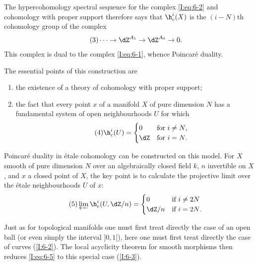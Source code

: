 The hypercohomology spectral sequence for the complex
\eqref{I:eq:6-2} and cohomology with proper support therefore says that
$\h_c^i(X)$ is the $(i-N)$th cohomology group of the complex
\begin{equation}\tag{3}\label{I:eq:6-3}
  \cdots \to \dZ^{A_1} \to \dZ^{A_0} \to 0 \text{.}
\end{equation}
This complex is dual to the complex \eqref{I:eq:6-1}, whence Poincaré
duality.

The essential points of this construction are
\begin{enumerate}[\indent a)]
  \item the existence of a theory of cohomology with proper support;
  \item the fact that every point $x$ of a manifold $X$ of pure dimension
    $N$ has a fundamental system of open neighbourhoods $U$ for which
    \begin{equation}\tag{4}\label{I:eq:6-4}
      \h_c^i(U) = \begin{cases}
                    0   & \text{for $i\ne N$,} \\
                    \dZ & \text{for $i=N$.}
                  \end{cases}
    \end{equation}
\end{enumerate}

Poincaré duality in étale cohomology can be constructed on this model.
For $X$ smooth of pure dimension $N$ over an algebraically closed field
$k$, $n$ invertible on $X$, and $x$ a closed point of $X$, the key
point is to calculate the projective limit over the étale neighbourhoods
$U$ of $x$:
\begin{equation}\tag{5}\label{I:eq:6-5}
  \varprojlim \h_c^i(U,\dZ/n)
    = \begin{cases}
        0     & \text{if $i\ne 2N$} \\
        \dZ/n & \text{if $i=2N$.}
      \end{cases}
\end{equation}

Just as for topological manifolds one must first treat directly the case
of an open ball (or even simply the interval $]0,1[$), here one must
first treat directly the case of curves (\ref{I:6-2}). The local
acyclicity theorem for smooth morphisms then reduces
\eqref{I:eq:6-5} to this special case (\ref{I:6-3}).

